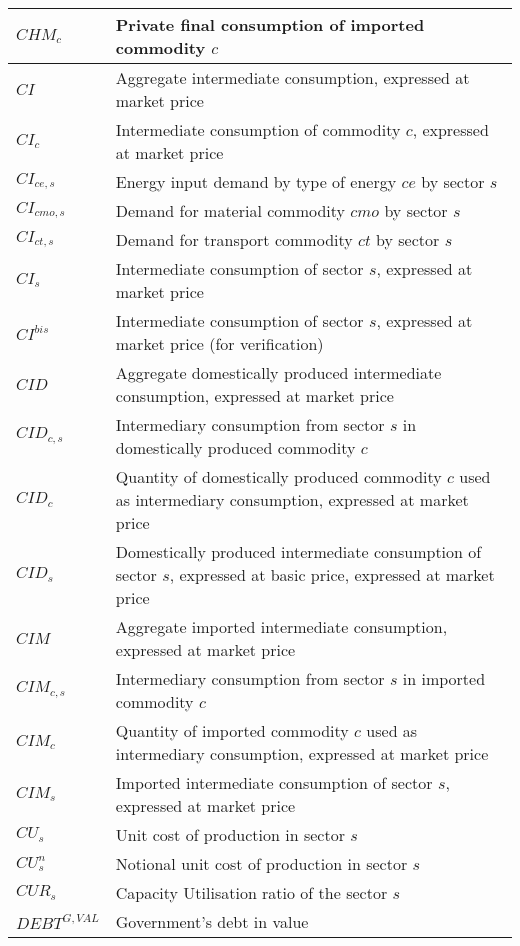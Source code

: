 \documentclass[12pt]{article}
\numberwithin{equation}{section}
\begin{document}
\begin{longtable}{@{}p{4cm}p{9cm}@{}}
 \midrule 
$CHM_{c}$ & Private final consumption of imported commodity $c$ \\
 \midrule 
$CI$ & Aggregate intermediate consumption, expressed at market price \\
 \midrule 
$CI_{c}$ & Intermediate consumption of commodity $c$, expressed at market price \\
 \midrule 
$CI_{ce, s}$ & Energy input demand by type of energy $ce$ by sector $s$ \\
 \midrule 
$CI_{cmo, s}$ & Demand for material commodity $cmo$ by sector $s$ \\
 \midrule 
$CI_{ct, s}$ & Demand for transport commodity $ct$ by sector $s$ \\
 \midrule 
$CI_{s}$ & Intermediate consumption of sector $s$, expressed at market price \\
 \midrule 
$CI^{bis}$ & Intermediate consumption of sector $s$, expressed at market price (for verification) \\
 \midrule 
$CID$ & Aggregate domestically produced intermediate consumption, expressed at market price \\
 \midrule 
$CID_{c, s}$ & Intermediary consumption from sector $s$ in domestically produced commodity $c$ \\
 \midrule 
$CID_{c}$ & Quantity of domestically produced commodity $c$ used as intermediary consumption, expressed at market price \\
 \midrule 
$CID_{s}$ & Domestically produced intermediate consumption of sector $s$, expressed at basic price, expressed at market price \\
 \midrule 
$CIM$ &  Aggregate imported intermediate consumption, expressed at market price \\
 \midrule 
$CIM_{c, s}$ & Intermediary consumption from sector $s$ in imported commodity $c$ \\
 \midrule 
$CIM_{c}$ & Quantity of imported commodity $c$ used as intermediary consumption, expressed at market price \\
 \midrule 
$CIM_{s}$ & Imported intermediate consumption of sector $s$, expressed at market price \\
 \midrule 
$CU_{s}$ & Unit cost of production in sector $s$ \\
 \midrule 
$CU^{n}_{s}$ & Notional unit cost of production in sector $s$ \\
 \midrule 
$CUR_{s}$ & Capacity Utilisation ratio of the sector $s$ \\
 \midrule 
$DEBT^{G,VAL}$ & Government's debt in value \\

\end{longtable}
\end{document}
